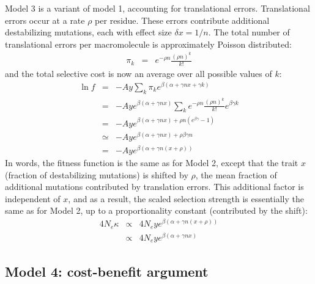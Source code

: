 \documentclass{article}
\begin{document}
Model 3 is a variant of model 1, accounting for translational errors. Translational errors occur at a rate $\rho$ per residue. These errors contribute additional destabilizing mutations, each with effect size $\delta x = 1/n$. The total number of translational errors per macromolecule is approximately Poisson distributed:
\begin{eqnarray}
\pi_k &=& e^{-\rho n} \frac{(\rho n)^k}{k!}
\end{eqnarray}
and the total selective cost is now an average over all possible values of $k$:
\begin{eqnarray}
\ln f &=& - A y \sum_k \pi_k e^{\beta(\alpha + \gamma n x + \gamma k)}
\\
&=& - A y  e^{\beta(\alpha + \gamma n x)} \sum_k e^{-\rho n} \frac{(\rho n)^k}{k!} e^{\beta \gamma k}
\\
&=& - A y  e^{\beta(\alpha + \gamma n x) + \rho n (e^{\beta \gamma} -1 )}
\\
& \simeq & - A y  e^{\beta(\alpha + \gamma n x) + \rho \beta \gamma n}
\\
& =& - A y  e^{\beta(\alpha + \gamma n (x + \rho))}
\end{eqnarray}
In words, the fitness function is the same as for Model 2, except that the trait $x$ (fraction of destabilizing mutations) is shifted by $\rho$, the mean fraction of additional mutations contributed by translation errors. This additional factor is independent of $x$, and as a result, the scaled selection strength is essentially the same as for Model 2, up to a proportionality constant (contributed by the shift):
\begin{eqnarray}
4 N_e \kappa &\propto& 4 N_e y e^{\beta(\alpha + \gamma n (x + \rho))}
\\ &\propto& 4 N_e y e^{\beta(\alpha + \gamma n x)}
\end{eqnarray}

\subsection*{Model 4: cost-benefit argument}
\end{document}
